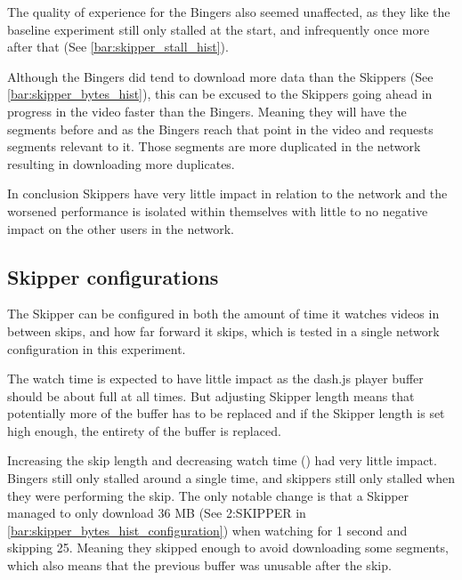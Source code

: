 \if{}

\fi

The quality of experience for the Bingers also seemed unaffected, as they like the baseline experiment still only stalled at the start, and infrequently once more after that (See \autoref{bar:skipper_stall_hist}). 

\if{}

\fi


Although the Bingers did tend to download more data than the Skippers (See \autoref{bar:skipper_bytes_hist}), this can be excused to the Skippers going ahead in progress in the video faster than the Bingers. Meaning they will have the segments before and as the Bingers reach that point in the video and requests segments relevant to it. Those segments are more duplicated in the network resulting in downloading more duplicates.

\if{}

\fi


In conclusion Skippers have very little impact in relation to the network and the worsened performance is isolated within themselves with little to no negative impact on the other users in the network.

\subsection{Skipper configurations}
The Skipper can be configured in both the amount of time it watches videos in between skips, and how far forward it skips, which is tested in a single network configuration in this experiment.

The watch time is expected to have little impact as the dash.js player buffer should be about full at all times. But adjusting Skipper length means that potentially more of the buffer has to be replaced and if the Skipper length is set high enough, the entirety of the buffer is replaced. %

Increasing the skip length and decreasing watch time () had very little impact. Bingers still only stalled around a single time, and skippers still only stalled when they were performing the skip. The only notable change is that a Skipper managed to only download 36 \ac{MB} (See 2:SKIPPER in \autoref{bar:skipper_bytes_hist_configuration}) when watching for 1 second and skipping 25. Meaning they skipped enough to avoid downloading some segments, which also means that the previous buffer was unusable after the skip. 

